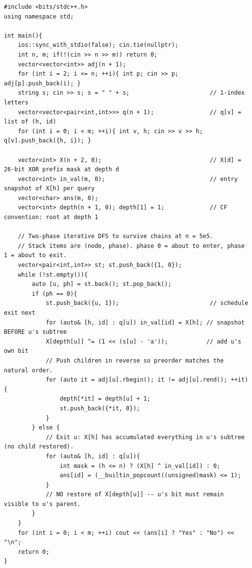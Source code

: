 \begin{lstlisting}[caption={CF 570D via iterative two-phase DFS with a per-depth prefix XOR accumulator (never restored); \lstinline{int} is enough for 26-bit masks}, label={lst:c10-570d-soln}]
#include <bits/stdc++.h>
using namespace std;

int main(){
    ios::sync_with_stdio(false); cin.tie(nullptr);
    int n, m; if(!(cin >> n >> m)) return 0;
    vector<vector<int>> adj(n + 1);
    for (int i = 2; i <= n; ++i){ int p; cin >> p; adj[p].push_back(i); }
    string s; cin >> s; s = " " + s;                       // 1-index letters
    vector<vector<pair<int,int>>> q(n + 1);                // q[v] = list of (h, id)
    for (int i = 0; i < m; ++i){ int v, h; cin >> v >> h; q[v].push_back({h, i}); }

    vector<int> X(n + 2, 0);                               // X[d] = 26-bit XOR prefix mask at depth d
    vector<int> in_val(m, 0);                              // entry snapshot of X[h] per query
    vector<char> ans(m, 0);
    vector<int> depth(n + 1, 0); depth[1] = 1;             // CF convention: root at depth 1

    // Two-phase iterative DFS to survive chains at n = 5e5.
    // Stack items are (node, phase). phase 0 = about to enter, phase 1 = about to exit.
    vector<pair<int,int>> st; st.push_back({1, 0});
    while (!st.empty()){
        auto [u, ph] = st.back(); st.pop_back();
        if (ph == 0){
            st.push_back({u, 1});                          // schedule exit next
            for (auto& [h, id] : q[u]) in_val[id] = X[h]; // snapshot BEFORE u's subtree
            X[depth[u]] ^= (1 << (s[u] - 'a'));           // add u's own bit
            // Push children in reverse so preorder matches the natural order.
            for (auto it = adj[u].rbegin(); it != adj[u].rend(); ++it){
                depth[*it] = depth[u] + 1;
                st.push_back({*it, 0});
            }
        } else {
            // Exit u: X[h] has accumulated everything in u's subtree (no child restored).
            for (auto& [h, id] : q[u]){
                int mask = (h <= n) ? (X[h] ^ in_val[id]) : 0;
                ans[id] = (__builtin_popcount((unsigned)mask) <= 1);
            }
            // NO restore of X[depth[u]] -- u's bit must remain visible to u's parent.
        }
    }
    for (int i = 0; i < m; ++i) cout << (ans[i] ? "Yes" : "No") << "\n";
    return 0;
}
\end{lstlisting}


